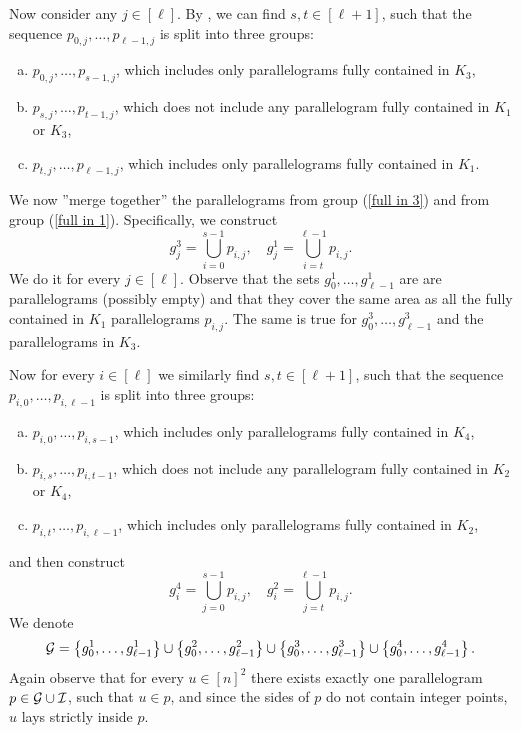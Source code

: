 \documentclass[11pt, letterpaper]{article}
\theoremstyle{plain}
\theoremstyle{definition}
\theoremstyle{remark}
\newcommand{\set}[1]{\left\lbrace #1 \right\rbrace}
\begin{document}
Now consider any $j \in [\ell]$.
By , we can find $s, t \in [\ell + 1]$, such that the sequence $p_{0, j}, \dots, p_{\ell - 1, j}$ is split into three groups:
\begin{enumerate}[a)]
	\item $p_{0, j}, \dots, p_{s - 1, j}$, which includes only parallelograms fully contained in $K_3$, \label{full in 3}
	\item $p_{s, j}, \dots, p_{t - 1, j}$, which does not include any parallelogram fully contained in $K_1$ or $K_3$,
	\item $p_{t, j}, \dots, p_{\ell - 1, j}$, which includes only parallelograms fully contained in $K_1$. \label{full in 1}
\end{enumerate}
We now ''merge together'' the parallelograms from group (\ref{full in 3}) and from group (\ref{full in 1}).
Specifically, we construct
\[
g^3_j = \bigcup_{i = 0}^{s - 1} p_{i, j}, \quad 
g^1_j = \bigcup_{i = t}^{\ell - 1} p_{i, j}.
\]
We do it for every $j \in [\ell]$.
Observe that the sets $g^1_0, \dots, g^1_{\ell - 1}$ are are parallelograms (possibly empty) and that they cover the same area as all the fully contained in $K_1$ parallelograms $p_{i, j}$.
The same is true for $g^3_0, \dots, g^3_{\ell - 1}$ and the parallelograms in $K_3$. 

Now for every $i \in [\ell]$ we similarly find $s, t \in [\ell + 1]$, such that the sequence $p_{i, 0}, \dots, p_{i, \ell - 1}$ is split into three groups:
\begin{enumerate}[a)]
	\item $p_{i, 0}, \dots, p_{i, s - 1}$, which includes only parallelograms fully contained in $K_4$,
	\item $p_{i, s}, \dots, p_{i, t - 1}$, which does not include any parallelogram fully contained in $K_2$ or $K_4$,
	\item $p_{i, t}, \dots, p_{i, \ell - 1}$, which includes only parallelograms fully contained in $K_2$,
\end{enumerate}
and then construct
\[
g^4_i = \bigcup_{j = 0}^{s - 1} p_{i, j}, \quad 
g^2_i = \bigcup_{j = t}^{\ell - 1} p_{i, j}.
\]
We denote
\[
\G = \set{g^1_0, \dots, g^1_{\ell - 1}}  
\cup \set{g^2_0, \dots, g^2_{\ell - 1}}
\cup \set{g^3_0, \dots, g^3_{\ell - 1}}
\cup \set{g^4_0, \dots, g^4_{\ell - 1}}.
\]
Again observe that for every $u \in [n]^2$ there exists exactly one parallelogram $p \in \mathcal{G} \cup \mathcal{I}$, such that $u \in p$, and since the sides of $p$ do not contain integer points, $u$ lays strictly inside $p$.
\end{document}
